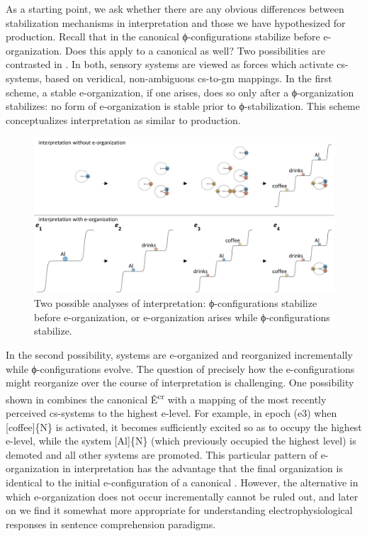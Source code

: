   As a starting point, we ask whether there are any obvious differences between stabilization mechanisms in interpretation and those we have hypothesized for production. Recall that in the canonical  ϕ-configurations stabilize before e-organization. Does this apply to a canonical  as well? Two possibilities are contrasted in {}. In both, sensory systems are viewed as  forces which activate cs-systems, based on veridical, non-ambiguous cs-to-gm mappings. In the first scheme, a stable e-organization, if one arises, does so only after a ϕ-organization stabilizes: no form of e-organization is stable prior to ϕ-stabilization. This scheme conceptualizes interpretation as similar to production.

  
\begin{figure}
\includegraphics[width=\textwidth]{figures/Tilsen-img90.png}
\caption{Two possible analyses of interpretation: ϕ-configurations stabilize before e-organization, or e-organization arises while ϕ-configurations stabilize.}
\label{fig:4:40}
\end{figure}
 

  In the second possibility, systems are e-organized and reorganized incrementally while ϕ-configurations evolve. The question of precisely how the e-configurations might reorganize over the course of interpretation is challenging. One possibility shown in {} combines the canonical  Ê\textsuperscript{cr} with a mapping of the most recently perceived cs-systems to the highest e-level. For example, in epoch (e3) when [coffee]\{N\} is activated, it becomes sufficiently excited so as to occupy the highest e-level, while the system [Al]\{N\} (which previously occupied the highest level) is demoted and all other systems are promoted. This particular pattern of e-organization in interpretation has the advantage that the final organization is identical to the initial e-configuration of a canonical . However, the alternative in which e-organization does not occur incrementally cannot be ruled out, and later on we find it somewhat more appropriate for understanding electrophysiological responses in sentence comprehension paradigms.

